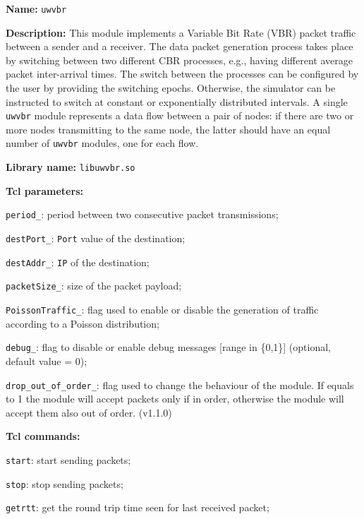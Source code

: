\vspace{1 cm}

\begin{description}
    \item {\bf Name:} {\tt uwvbr}
    \item {\bf Description:} This module implements a Variable Bit Rate (VBR) packet traffic between a sender and a receiver. The data packet generation process takes place by switching between two different CBR processes, e.g., having different average packet inter-arrival times. 
    The switch between the processes can be configured by the user by providing the switching epochs. Otherwise, the simulator can be instructed to switch at constant or exponentially distributed intervals. A single {\tt uwvbr} module represents a data flow between a pair of nodes: if there are two or more nodes transmitting to the same node, the latter should have an equal number of {\tt uwvbr} modules, one for each flow.
   \item {\bf Library name:} {\tt libuwvbr.so}
   \item {\bf Tcl parameters:} 
   \begin{description}
    \item {\tt period\_}: period between two consecutive packet transmissions;
    \item {\tt destPort\_}: {\tt Port} value of the destination;
    \item {\tt destAddr\_}: {\tt IP} of the destination;
    \item {\tt packetSize\_}: size of the packet payload;
    \item {\tt PoissonTraffic\_}: flag used to enable or disable the generation of traffic according to a Poisson distribution;
    \item {\tt debug\_}: flag to disable or enable debug messages [range in \{0,1\}] (optional, default value = 0);
    \item {\tt drop\_out\_of\_order\_}: flag used to change the behaviour of the module. If equals to 1 the module will accept packets only if in order, otherwise the module will accept them also out of order. (v1.1.0)
   \end{description}
   \item {\bf Tcl commands:}
   \begin{description}
    \item {\tt start}: start sending packets;
    \item {\tt stop}: stop sending packets;
    \item {\tt getrtt}: get the round trip time seen for last received packet;

\end{description}
\end{description}
